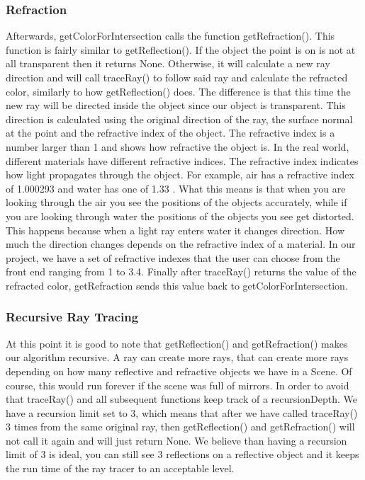 \documentclass[10pt]{scrartcl}
\begin{document}
\subsubsection{ Refraction }
Afterwards, getColorForIntersection calls the function getRefraction(). This function is fairly similar to getReflection(). If the object the point is on is not at all transparent then it returns None. Otherwise, it will calculate a new ray direction and will call traceRay() to follow said ray and calculate the refracted color, similarly to how getReflection() does. The difference is that this time the new ray will be directed inside the object since our object is transparent. This direction is calculated using the original direction of the ray, the surface normal at the point and the refractive index of the object. The refractive index is a number larger than 1 and shows how refractive the object is. In the real world, different materials have different refractive indices. The refractive index indicates how light propagates through the object. For example, air has a refractive index of 1.000293 and water has one of 1.33 . What this means is that when you are looking through the air you see the positions of the objects accurately, while if you are looking through water the positions of the objects you see get distorted. This happens because when a light ray enters water it changes direction. How much the direction changes depends on the refractive index of a material. In our project, we have a set of refractive indexes that the user can choose from the front end ranging from 1 to 3.4. Finally after traceRay() returns the value of the refracted color, getRefraction sends this value back to getColorForIntersection.
\par

\subsubsection{ Recursive Ray Tracing }
At this point it is good to note that getReflection() and getRefraction() makes our algorithm recursive. A ray can create more rays, that can create more rays depending on how many reflective and refractive objects we have in a Scene. Of course, this would run forever if the scene was full of mirrors. In order to avoid that traceRay() and all subsequent functions keep track of a recursionDepth. We have a recursion limit set to 3, which means that after we have called traceRay() 3 times from the same original ray, then getReflection() and getRefraction() will not call it again and will just return None. We believe than having a recursion limit of 3 is ideal, you can still see 3 reflections on a reflective object and it keeps the run time of the ray tracer to an acceptable level. 
\end{document}
